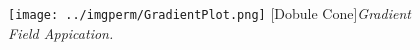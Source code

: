 \begin{figure}[H]
\centering
\texttt{[image: ../imgperm/GradientPlot.png]}
[Dobule Cone]{\textit{Gradient Field Appication.}}
\label{fig:GradientPlot}
\end{figure}
